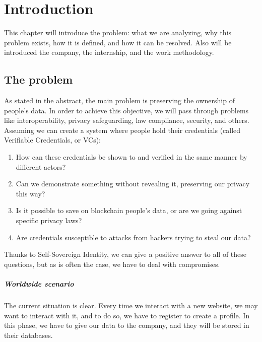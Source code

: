 
\chapter{Introduction}
This chapter will introduce the problem: what we are analyzing, why 
this problem exists, how it is defined, and how it can be resolved. 
Also will be introduced the company, the internship, and the work 
methodology.
\section{The problem}
As stated in the abstract, the main problem is preserving the ownership 
of people's data. In order to achieve this objective, we will pass through 
problems like interoperability, privacy safeguarding, law compliance, security,
and others.
\vspace*{0.3cm}\\
Assuming we can create a system where people hold their credentials 
(called Verifiable Credentials, or VCs):
\begin{enumerate}
    \setlength\itemsep{-0.3em}
    \item How can these credentials be shown to and verified in the 
    same manner by different actors?
    \item Can we demonstrate something without revealing it, preserving
    our privacy this way?
    \item Is it possible to save on blockchain people's data, or are we
    going against specific privacy laws?
    \item Are credentials susceptible to attacks from hackers trying to 
    steal our data?
\end{enumerate}
Thanks to Self-Sovereign Identity, we can give a positive answer to all
of these questions, but as is often the case, we have to deal with 
compromises.

\paragraph{Worldwide scenario}
The current situation is clear. Every time we interact with a new website,
we may want to interact with it, and to do so, we have to register to create 
a profile. In this phase, we have to give our data to the company, and they 
will be stored in their databases.

